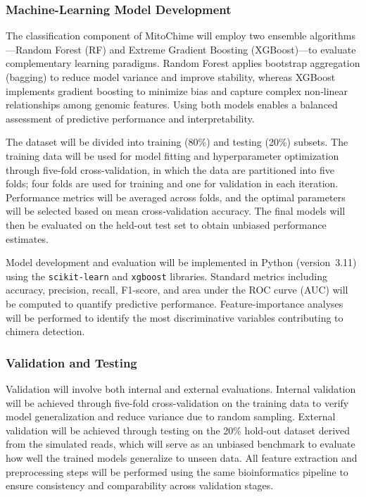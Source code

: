 \subsubsection{Machine-Learning Model Development}

The classification component of MitoChime will employ two ensemble algorithms—Random Forest (RF) and Extreme Gradient Boosting (XGBoost)—to evaluate complementary learning paradigms. Random Forest applies bootstrap aggregation (bagging) to reduce model variance and improve stability, whereas XGBoost implements gradient boosting to minimize bias and capture complex non-linear relationships among genomic features. Using both models enables a balanced assessment of predictive performance and interpretability.

The dataset will be divided into training (80\%) and testing (20\%) subsets. The training data will be used for model fitting and hyperparameter optimization through five-fold cross-validation, in which the data are partitioned into five folds; four folds are used for training and one for validation in each iteration. Performance metrics will be averaged across folds, and the optimal parameters will be selected based on mean cross-validation accuracy. The final models will then be evaluated on the held-out test set to obtain unbiased performance estimates.

Model development and evaluation will be implemented in Python (version~3.11) using the \texttt{scikit-learn} and \texttt{xgboost} libraries. Standard metrics including accuracy, precision, recall, F1-score, and area under the ROC curve (AUC) will be computed to quantify predictive performance. Feature-importance analyses will be performed to identify the most discriminative variables contributing to chimera detection.

\subsubsection{Validation and Testing}

Validation will involve both internal and external evaluations. Internal validation will be achieved through five-fold cross-validation on the training data to verify model generalization and reduce variance due to random sampling. External validation will be achieved through testing on the 20\% hold-out dataset derived from the simulated reads, which will serve as an unbiased benchmark to evaluate how well the trained models generalize to unseen data. All feature extraction and preprocessing steps will be performed using the same bioinformatics pipeline to ensure consistency and comparability across validation stages.

